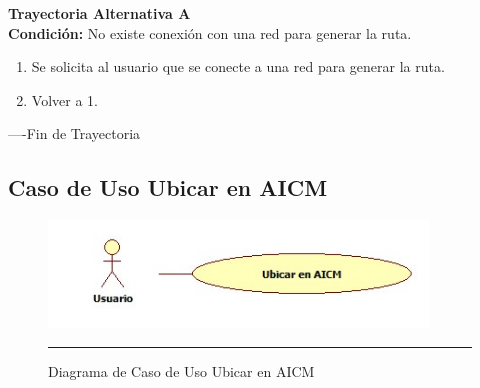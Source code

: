 \begin{flushleft}
	\hypertarget{TrayectoriaA_CU-U-07}{}
	\textbf{Trayectoria Alternativa A}\\
	\textbf{Condición:} No existe conexión con una red para generar la ruta. \\
	\begin{enumerate}
		\item Se solicita al usuario que se conecte a una red para generar la ruta. 
		\item Volver a 1.
	\end{enumerate}
\end{flushleft}
----Fin de Trayectoria
\clearpage

\subsection{Caso de Uso Ubicar en AICM}

\begin{figure}[htbp]
	\centering
		\includegraphics[width=0.9\textwidth]{Figuras/cuUbicarAICM.jpg}
		\rule{30em}{0.5pt}
	\caption[Diagrama de Caso de Uso Ubicar en AICM]{Diagrama de Caso de Uso Ubicar en AICM}
	\label{fig:cuUbicarAICM}
\end{figure}

